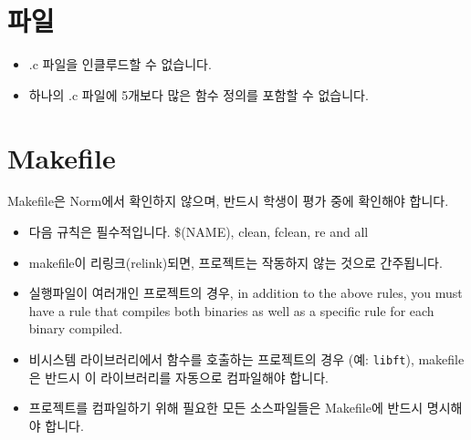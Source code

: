 \documentclass{42-ko}
\begin{document}
    \section{파일}

        \begin{itemize}

            \item .c 파일을 인클루드할 수 없습니다.

            \item 하나의 .c 파일에 5개보다 많은 함수 정의를 포함할 수 없습니다.

        \end{itemize}
        \newpage


    \section{Makefile}

            Makefile은 Norm에서 확인하지 않으며, 반드시 학생이 평가 중에 확인해야 합니다.
            \begin{itemize}

                \item 다음 규칙은 필수적입니다. \$(NAME), clean, fclean, re and all

                \item makefile이 리링크(relink)되면, 프로젝트는 작동하지 않는 것으로 간주됩니다.

                \item 실행파일이 여러개인 프로젝트의 경우, in addition to
                  the above rules, you must have a rule that compiles
                  both binaries as well as a specific rule for each
                  binary compiled.

                  \item 비시스템 라이브러리에서 함수를 호출하는 프로젝트의 경우
                  (예: \texttt{libft}), makefile은 반드시 이 라이브러리를 자동으로
                  컴파일해야 합니다.

                  \item 프로젝트를 컴파일하기 위해 필요한 모든 소스파일들은 
                    Makefile에 반드시 명시해야 합니다.

            \end{itemize}
\end{document}

